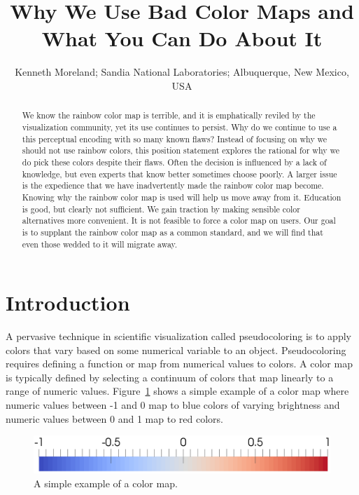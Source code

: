 \documentclass[letterpaper,twocolumn,fleqn]{article}
\title{Why We Use Bad Color Maps and What You Can Do About It}
\author{Kenneth Moreland; Sandia National Laboratories; Albuquerque, New
  Mexico, USA}
\date{} %
\begin{document}
 

\maketitle 

\thispagestyle{empty} %

\begin{abstract}
\noindent
We know the rainbow color map is terrible, and it is emphatically reviled
by the visualization community, yet its use continues to persist. Why do we
continue to use a this perceptual encoding with so many known flaws?
Instead of focusing on why we should not use rainbow colors, this position
statement explores the rational for why we do pick these colors despite
their flaws. Often the decision is influenced by a lack of knowledge, but
even experts that know better sometimes choose poorly. A larger issue is
the expedience that we have inadvertently made the rainbow color map
become. Knowing why the rainbow color map is used will help us move away
from it. Education is good, but clearly not sufficient. We gain traction by
making sensible color alternatives more convenient. It is not feasible to
force a color map on users. Our goal is to supplant the rainbow color map
as a common standard, and we will find that even those wedded to it will
migrate away.
\end{abstract}


\section{Introduction}

\noindent
A pervasive technique in scientific visualization called pseudocoloring is
to apply colors that vary based on some numerical variable to an object.
Pseudocoloring requires defining a function or map from numerical values to
colors. A color map is typically defined by selecting a continuum of colors
that map linearly to a range of numeric values.
Figure~\ref{fig:ColorMapExample} shows a simple example of a color map
where numeric values between -1 and 0 map to blue colors of varying
brightness and numeric values between 0 and 1 map to red colors.

\begin{figure}[htb]
  \centering
  \includegraphics[width=.9\linewidth]{images/ColorMapExample}
  \caption{A simple example of a color map.}
  \label{fig:ColorMapExample}
\end{figure}
\end{document}
